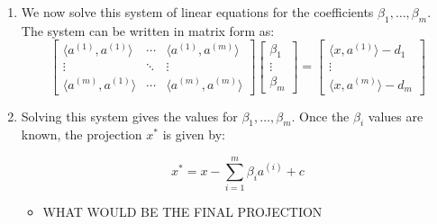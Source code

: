 \begin{derivation}
\begin{enumerate}
                \item We now solve this system of linear equations for the coefficients $\beta_1, \dots, \beta_m$. The system can be written in matrix form as:
                \[
                \begin{bmatrix}
                \langle a^{(1)}, a^{(1)} \rangle & \cdots & \langle a^{(1)}, a^{(m)} \rangle \\
                \vdots & \ddots & \vdots \\
                \langle a^{(m)}, a^{(1)} \rangle & \cdots & \langle a^{(m)}, a^{(m)} \rangle
                \end{bmatrix}
                \begin{bmatrix}
                \beta_1 \\
                \vdots \\
                \beta_m
                \end{bmatrix}
                =
                \begin{bmatrix}
                \langle x, a^{(1)} \rangle - d_1 \\
                \vdots \\
                \langle x, a^{(m)} \rangle - d_m
                \end{bmatrix}
                \]
                
                \item Solving this system gives the values for $\beta_1, \dots, \beta_m$. Once the $\beta_i$ values are known, the projection $x^*$ is given by:
                
                \[
                x^* = x - \sum_{i=1}^{m} \beta_i a^{(i)} + c
                \]
                \begin{itemize}
                    \item WHAT WOULD BE THE FINAL PROJECTION
                \end{itemize}
            \end{enumerate}            
        \end{derivation}


